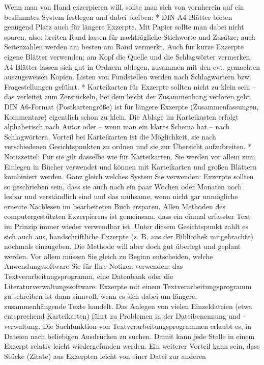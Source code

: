 \documentclass[]{book}
\theoremstyle{definition}
\theoremstyle{definition}
\theoremstyle{definition}
\theoremstyle{remark}
\begin{document}
Wenn man von Hand exzerpieren will, sollte man sich von vornherein auf
ein bestimmtes System festlegen und dabei bleiben: * DIN A4-Blätter
bieten genügend Platz auch für längere Exzerpte. Mit Papier sollte man
dabei nicht sparen, also: breiten Rand lassen für nachträgliche
Stichworte und Zusätze; auch Seitenzahlen werden am besten am Rand
vermerkt. Auch für kurze Exzerpte eigene Blätter verwenden; am Kopf die
Quelle und die Schlagwörter vermerken. A4-Blätter lassen sich gut in
Ordnern ablegen, zusammen mit den evt. gemachten auszugsweisen Kopien.
Listen von Fundstellen werden nach Schlagwörtern bzw. Fragestellungen
geführt. * Karteikarten für Exzerpte sollten nicht zu klein sein -- das
verleitet zum Zerstückeln, bei dem leicht der Zusammenhang verloren
geht. DIN A6-Format (Postkartengröße) ist für längere Exzerpte
(Zusammenfassungen, Kommentare) eigentlich schon zu klein. Die Ablage im
Karteikasten erfolgt alphabetisch nach Autor oder -- wenn man ein klares
Schema hat -- nach Schlagwörtern. Vorteil bei Karteikarten ist die
Möglichkeit, sie nach verschiedenen Gesichtspunkten zu ordnen und sie
zur Übersicht aufzubreiten. * Notizzettel: Für sie gilt dasselbe wie für
Karteikarten. Sie werden vor allem zum Einlegen in Bücher verwendet und
können mit Karteikarten und großen Blättern kombiniert werden. Ganz
gleich welches System Sie verwenden: Exzerpte sollten so geschrieben
sein, dass sie auch nach ein paar Wochen oder Monaten noch lesbar und
verständlich sind und das mühsame, wenn nicht gar unmögliche erneute
Nachlesen im bearbeiteten Buch ersparen. Allen Methoden des
computergestützten Exzerpierens ist gemeinsam, dass ein einmal erfasster
Text im Prinzip immer wieder verwendbar ist. Unter diesem Gesichtspunkt
zahlt es sich auch aus, handschriftliche Exzerpte (z. B. aus der
Bibliothek mitgebrachte) nochmals einzugeben. Die Methode will aber doch
gut überlegt und geplant werden. Vor allem müssen Sie gleich zu Beginn
entscheiden, welche Anwendungssoftware Sie für Ihre Notizen verwenden:
das Textverarbeitungsprogramm, eine Datenbank oder die
Literaturverwaltungssoftware. Exzerpte mit einem
Textverarbeitungsprogramm zu schreiben ist dann sinnvoll, wenn es sich
dabei um längere, zusammenhängende Texte handelt. Das Anlegen von vielen
Einzeldateien (etwa entsprechend Karteikarten) führt zu Problemen in der
Dateibenennung und -verwaltung. Die Suchfunktion von
Textverarbeitungsprogrammen erlaubt es, in Dateien nach beliebigen
Ausdrücken zu suchen. Damit kann jede Stelle in einem Exzerpt relativ
leicht wiedergefunden werden. Ein weiterer Vorteil kann sein, dass
Stücke (Zitate) aus Exzerpten leicht von einer Datei zur anderen
\end{document}
